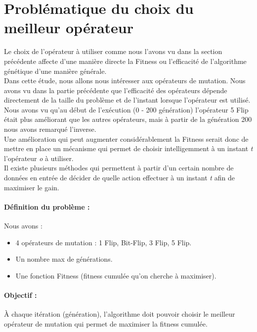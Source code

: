 \documentclass[12pt]{article}
\begin{document}

\section{Problématique du choix du meilleur opérateur}
Le choix de l'opérateur à utiliser comme nous l'avons vu dans la section précédente affecte d'une manière directe la Fitness ou l'efficacité de l'algorithme génétique d'une manière générale.\\

Dans cette étude, nous allons nous intéresser aux opérateurs de mutation. Nous avons vu dans la partie précédente que l'efficacité des opérateurs dépende directement de la taille du problème et de l'instant lorsque l'opérateur est utilisé. Nous avons vu qu'au début de l'exécution (0 - 200 génération) l'opérateur 5 Flip était plus améliorant que les autres opérateurs, mais à partir de la génération 200 nous avons remarqué l'inverse.\\

Une amélioration qui peut augmenter considérablement la Fitness serait donc de mettre en place un mécanisme qui permet de choisir intelligemment à un instant \textit{t} l'opérateur \textit{o} à utiliser.\\

Il existe plusieurs méthodes qui permettent à partir d'un certain nombre de données en entrée de décider de quelle action effectuer à un instant \textit{t} afin de maximiser le gain.

\paragraph{Définition du problème :} Nous avons :
\begin{itemize}[label=-]
\item 4 opérateurs de mutation : 1 Flip, Bit-Flip, 3 Flip, 5 Flip. 
\item Un nombre max de générations.
\item Une fonction Fitness (fitness cumulée qu'on cherche à maximiser).
\end{itemize}
\paragraph{Objectif : } À chaque itération (génération), l'algorithme doit pouvoir choisir le meilleur opérateur de mutation qui permet de maximiser la fitness cumulée. 
\end{document}
